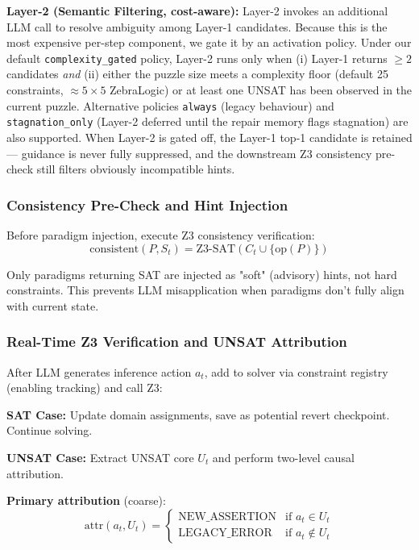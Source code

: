\textbf{Layer-2 (Semantic Filtering, cost-aware):} Layer-2 invokes an additional LLM call to resolve ambiguity among Layer-1 candidates. Because this is the most expensive per-step component, we gate it by an activation policy. Under our default \texttt{complexity\_gated} policy, Layer-2 runs only when (i) Layer-1 returns $\geq 2$ candidates \emph{and} (ii) either the puzzle size meets a complexity floor (default 25 constraints, $\approx 5\!\times\!5$ ZebraLogic) or at least one UNSAT has been observed in the current puzzle. Alternative policies \texttt{always} (legacy behaviour) and \texttt{stagnation\_only} (Layer-2 deferred until the repair memory flags stagnation) are also supported. When Layer-2 is gated off, the Layer-1 top-1 candidate is retained — guidance is never fully suppressed, and the downstream Z3 consistency pre-check still filters obviously incompatible hints.

\subsubsection{Consistency Pre-Check and Hint Injection}

Before paradigm injection, execute Z3 consistency verification:
$$\text{consistent}(P, S_t) = \text{Z3-SAT}(C_t \cup \{\text{op}(P)\})$$

Only paradigms returning SAT are injected as "soft" (advisory) hints, not hard constraints. This prevents LLM misapplication when paradigms don't fully align with current state.

\subsubsection{Real-Time Z3 Verification and UNSAT Attribution}

After LLM generates inference action $a_t$, add to solver via constraint registry (enabling tracking) and call Z3:

\textbf{SAT Case:} Update domain assignments, save as potential revert checkpoint. Continue solving.

\textbf{UNSAT Case:} Extract UNSAT core $U_t$ and perform two-level causal attribution.

\textbf{Primary attribution} (coarse):
$$\text{attr}(a_t, U_t) = \begin{cases} \text{NEW\_ASSERTION} & \text{if } a_t \in U_t \\ \text{LEGACY\_ERROR} & \text{if } a_t \notin U_t \end{cases}$$

